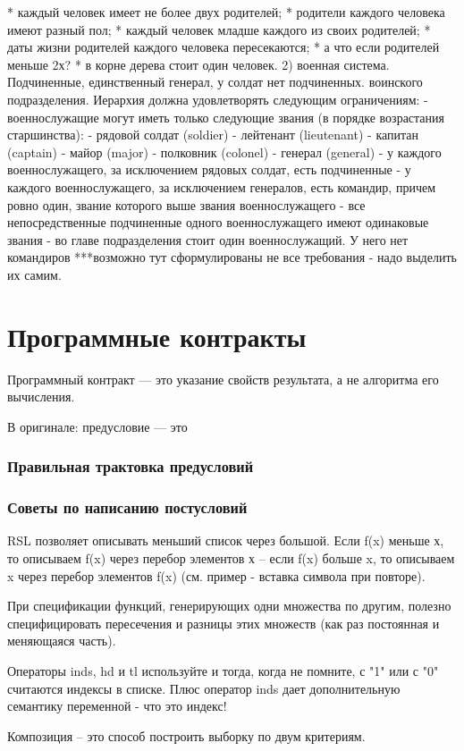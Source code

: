 \documentclass[14pt, twoside]{extreport}
\newcommand{\head}[1]{\vspace{1cm}\subsubsection*{#1}}
\begin{document}
    * каждый человек имеет не более двух родителей;
    * родители каждого человека имеют разный пол;
    * каждый человек младше каждого из своих родителей;
    * даты жизни родителей каждого человека пересекаются; * а что если родителей меньше 2х?
    * в корне дерева стоит один человек.
2) военная система. Подчиненные, единственный генерал, у солдат нет подчиненных. воинского подразделения. Иерархия должна удовлетворять следующим ограничениям:
- военнослужащие могут иметь только следующие звания (в порядке возрастания старшинства):
     - рядовой солдат (soldier)
     - лейтенант (lieutenant)
     - капитан (captain)
     - майор (major)
     - полковник (colonel)
     - генерал (general)
- у каждого военнослужащего, за исключением рядовых солдат, есть подчиненные
- у каждого военнослужащего, за исключением генералов, есть командир, причем ровно
один, звание которого выше звания военнослужащего
- все непосредственные подчиненные одного военнослужащего имеют одинаковые звания
- во главе подразделения стоит один военнослужащий. У него нет командиров
***возможно тут сформулированы не все требования - надо выделить их самим.



\section{Программные контракты}

Программный контракт --- это указание свойств результата, а не алгоритма его вычисления.

В оригинале: предусловие --- это 


\head{Правильная трактовка предусловий}


\head{Советы по написанию постусловий}

RSL позволяет описывать меньший список через большой. Если f(x) меньше х, то описываем f(x) через перебор элементов х -- если f(x) больше x, то описываем x через перебор элементов f(x) (см. пример - вставка символа при повторе).

При спецификации функций, генерирующих одни множества по другим, полезно специфицировать пересечения и разницы этих множеств (как раз постоянная и меняющаяся часть).

Операторы inds, hd и tl используйте и тогда, когда не помните, с "1" или с "0" считаются индексы в списке. Плюс оператор inds дает дополнительную семантику переменной - что это индекс!

Композиция -- это способ построить выборку по двум критериям.
\end{document}
